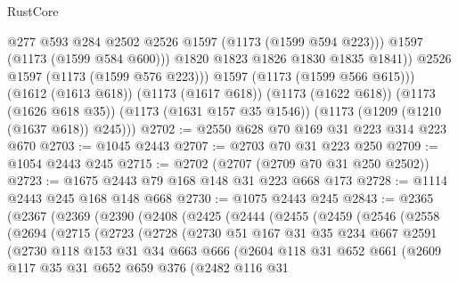 \begin{lexlean}{RustCore}
\begin{coremodule}
                  @277
                  @593
                  @284
                  @2502
                  @2526
                  @1597
                  (@1173 (@1599 @594 @223)))
                @1597
                (@1173 (@1599 @584 @600)))
              @1820
              @1823
              @1826
              @1830
              @1835
              @1841))
          @2526
          @1597
          (@1173 (@1599 @576 @223)))
        @1597
        (@1173 (@1599 @566 @615)))
      (@1612 (@1613 @618))
      (@1173 (@1617 @618))
      (@1173 (@1622 @618))
      (@1173 (@1626 @618 @35))
      (@1173 (@1631 @157 @35 @1546))
      (@1173 (@1209 (@1210 (@1637 @618)) @245)))
@2702 := @2550 @628 @70 @169 @31 @223 @314 @223 @670
@2703 := @1045 @2443
@2707 := @2703 @70 @31 @223 @250
@2709 := @1054 @2443 @245
@2715 := @2702 (@2707 (@2709 @70 @31 @250 @2502))
@2723 := @1675 @2443 @79 @168 @148 @31 @223 @668 @173
@2728 := @1114 @2443 @245 @168 @148 @668
@2730 := @1075 @2443 @245
@2843 := @2365
    (@2367
      (@2369
        (@2390
          (@2408
            (@2425
              (@2444
                (@2455
                  (@2459
                    (@2546
                      (@2558
                        (@2694
                          (@2715
                            (@2723
                              (@2728
                                (@2730
                                  @51
                                  @167
                                  @31
                                  @35
                                  @234
                                  @667
                                  @2591
                                  (@2730
                                    @118
                                    @153
                                    @31
                                    @34
                                    @663
                                    @666
                                    (@2604
                                      @118
                                      @31
                                      @652
                                      @661
                                      (@2609
                                        @117
                                        @35
                                        @31
                                        @652
                                        @659
                                        @376
                                        (@2482
                                          @116
                                          @31

\end{coremodule}
\end{lexlean}
